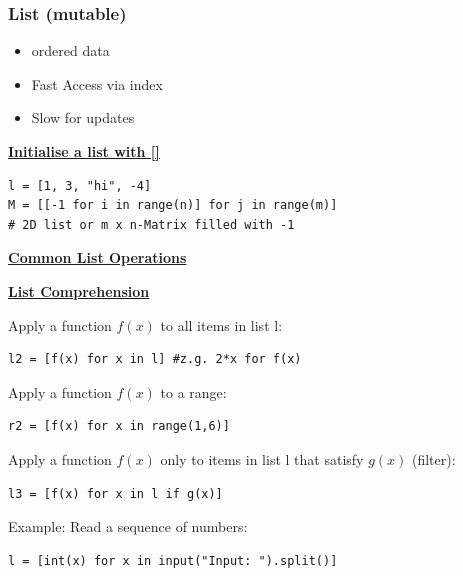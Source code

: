 \subsubsection{List (mutable)}
\begin{itemize}
    \item ordered data
    \item Fast Access via index
    \item Slow for updates
\end{itemize}

{\centering\underline{\textbf{Initialise a list with []}} \par}
\begin{lstlisting}
l = [1, 3, "hi", -4]
M = [[-1 for i in range(n)] for j in range(m)]
# 2D list or m x n-Matrix filled with -1
\end{lstlisting}

{\centering\underline{\textbf{Common List Operations}} \par}


{\centering\underline{\textbf{List Comprehension}} \par}
Apply a function $f(x)$ to all items in list l:
\begin{lstlisting}
l2 = [f(x) for x in l] #z.g. 2*x for f(x)
\end{lstlisting}
Apply a function $f(x)$ to a range:
\begin{lstlisting}
r2 = [f(x) for x in range(1,6)]
\end{lstlisting}
Apply a function $f(x)$ only to items in list l that satisfy $g(x)$ (filter):
\begin{lstlisting}
l3 = [f(x) for x in l if g(x)]
\end{lstlisting}
Example: Read a sequence of numbers:
\begin{lstlisting}
l = [int(x) for x in input("Input: ").split()]
\end{lstlisting}

